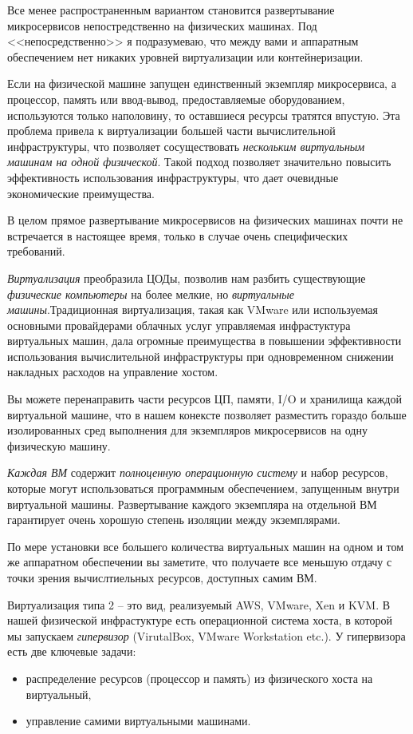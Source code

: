 \documentclass[%
	11pt,
	a4paper,
	utf8,
		]{article}
\begin{document}
Все менее распространенным вариантом становится развертывание микросервисов непостредственно на физических машинах. Под <<непосредственно>> я подразумеваю, что между вами и аппаратным обеспечением нет никаких уровней виртуализации или контейнеризации.

Если на физической машине запущен единственный экземпляр микросервиса, а процессор, память или ввод-вывод, предоставляемые оборудованием, используются только наполовину, то оставшиеся ресурсы тратятся впустую. Эта проблема привела к виртуализации большей части вычислительной инфраструктуры, что позволяет сосуществовать \emph{нескольким виртуальным машинам на одной физической}. Такой подход позволяет значительно повысить эффективность использования инфраструктуры, что дает очевидные экономические преимущества.

В целом прямое развертывание микросервисов на физических машинах почти не встречается в настоящее время, только в случае очень специфических требований.

\emph{\color{blue}Виртуализация} преобразила ЦОДы, {\color{blue}позволив нам разбить существующие \emph{физические компьютеры} на более мелкие, но \emph{виртуальные машины}}.Традиционная виртуализация, такая как VMware или используемая основными провайдерами облачных услуг управляемая инфрастуктура виртуальных машин, дала огромные преимущества в повышении эффективности использования вычислительной инфраструктуры при одновременном снижении накладных расходов на управление хостом.

Вы можете перенаправить части ресурсов ЦП, памяти, I/O и хранилища каждой виртуальной машине, что в нашем конексте позволяет разместить гораздо больше изолированных сред выполнения для экземпляров микросервисов на одну физическую машину.

\emph{Каждая ВМ} содержит \emph{\color{red}полноценную операционную систему} и набор ресурсов, которые могут использоваться программным обеспечением, запущенным внутри виртуальной машины. Развертывание каждого экземпляра на отдельной ВМ гарантирует очень хорошую степень изоляции между экземплярами.

По мере установки все большего количества виртуальных машин на одном и том же аппаратном обеспечении вы заметите, что получаете все меньшую отдачу с точки зрения вычислтиельных ресурсов, доступных самим ВМ. 

Виртуализация типа 2 -- это вид, реализуемый AWS, VMware, Xen и KVM. В нашей физической инфрастуктуре есть операционной система хоста, в которой мы запускаем \emph{гипервизор} (VirutalBox, VMware Workstation etc.). У гипервизора есть две ключевые задачи:
\begin{itemize}
	\item распределение ресурсов (процессор и память) из физического хоста на виртуальный,
	
	\item управление самими виртуальными машинами.
\end{itemize}
\end{document}
